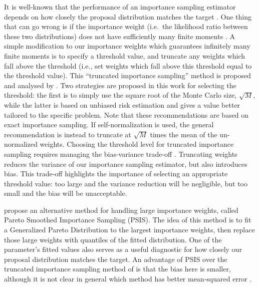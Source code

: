 \documentclass[11pt, oneside]{article}   	%
\begin{document}
It is well-known that the performance of an importance sampling estimator depends on how closely the proposal distribution matches the target \citep{Rob04}. One thing that can go wrong is if the importance weight (i.e.\ the likelihood ratio between these two distributions) does not have sufficiently many finite moments \citep{Aga17}. A simple modification to our importance weights which guarantees infinitely many finite moments is to specify a threshold value, and truncate any weights which fall above the threshold (i.e., set weights which fall above this threshold equal to the threshold value). This ``truncated importance sampling'' method is proposed and analysed by \citet{Ion08}. Two strategies are proposed in this work for selecting the threshold: the first is to simply use the square root of the Monte Carlo size, $\sqrt{M}$, while the latter is based on unbiased risk estimation and gives a value better tailored to the specific problem. Note that these recommendations are based on exact importance sampling. If self-normalization is used, the general recommendation is instead to truncate at $\sqrt{M}$ times the mean of the un-normalized weights. Choosing the threshold level for truncated importance sampling requires managing the bias-variance trade-off \citep{Has09}. Truncating weights reduces the variance of our importance sampling estimator, but also introduces bias. This trade-off highlights the importance of selecting an appropriate threshold value: too large and the variance reduction will be negligible, but too small and the bias will be unacceptable.

\citet{Veh22} propose an alternative method for handling large importance weights, called Pareto Smoothed Importance Sampling (PSIS). The idea of this method is to fit a Generalized Pareto Distribution to the largest importance weights, then replace those large weights with quantiles of the fitted distribution. One of the parameter's fitted values also serves as a useful diagnostic for how closely our proposal distribution matches the target. An advantage of PSIS over the truncated importance sampling method of \citet{Ion08} is that the bias here is smaller, although it is not clear in general which method has better mean-squared error \citep[see][for extensive numerical comparisons]{Veh22}.  
\end{document}
